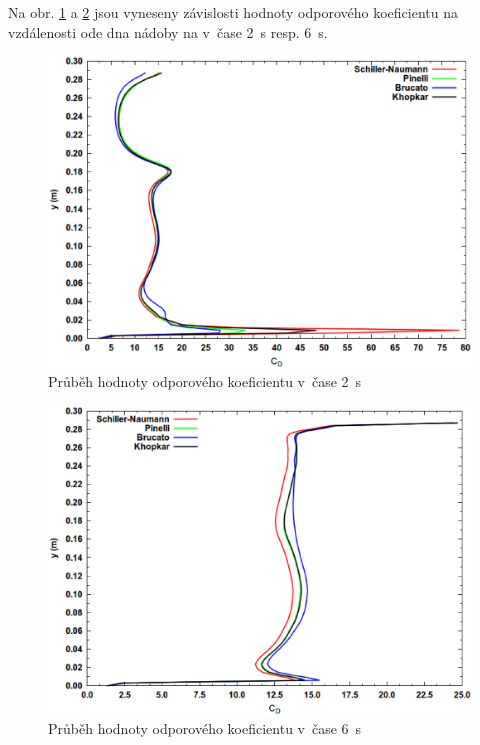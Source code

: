 
\newpage

Na obr. \ref{fig:cd2} a \ref{fig:cd6} jsou vyneseny závislosti hodnoty odporového koeficientu na vzdálenosti ode dna nádoby na v~čase \SI{2}{\second} resp. \SI{6}{\second}.

\begin{figure}[h!]
\begin{center}
\includegraphics[scale=0.47]{images/CD-2.eps}
\caption{Průběh hodnoty odporového koeficientu v~čase \SI{2}{\second}}
\label{fig:cd2}
\end{center}
\end{figure} 

\vspace{-12mm}

\begin{figure}[h!]
\begin{center}
\includegraphics[scale=0.47]{images/CD-6.eps}
\caption{Průběh hodnoty odporového koeficientu v~čase \SI{6}{\second}}
\label{fig:cd6}
\end{center}
\end{figure} 

